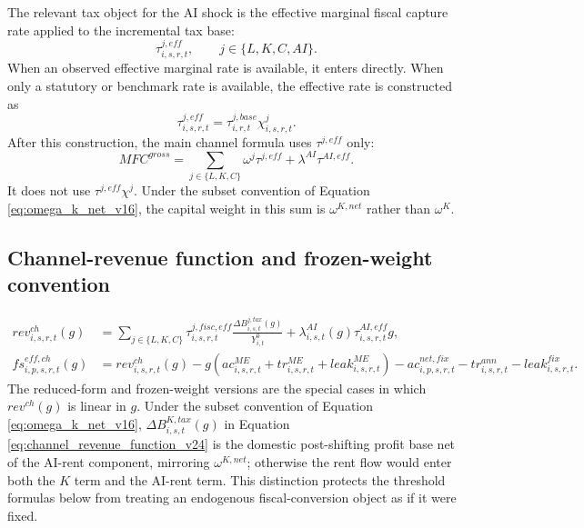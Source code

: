 \documentclass[11pt,a4paper]{article}
\begin{document}
The relevant tax object for the AI shock is the effective marginal fiscal capture rate applied to the incremental tax base:
\begin{equation}
    \tau^{j,eff}_{i,s,r,t},\qquad j\in\{L,K,C,AI\}.
\end{equation}
When an observed effective marginal rate is available, it enters directly. When only a statutory or benchmark rate is available, the effective rate is constructed as
\begin{equation}\label{eq:tau_eff_decomposition_v10}
    \tau^{j,eff}_{i,s,r,t}=\tau^{j,base}_{i,r,t}\chi^j_{i,s,r,t}.
\end{equation}
After this construction, the main channel formula uses $\tau^{j,eff}$ only:
\begin{equation}
    MFC^{gross}=\sum_{j\in\{L,K,C\}}\omega^j\tau^{j,eff}+\lambda^{AI}\tau^{AI,eff}.
\end{equation}
It does not use $\tau^{j,eff}\chi^j$. Under the subset convention of Equation \eqref{eq:omega_k_net_v16}, the capital weight in this sum is $\omega^{K,net}$ rather than $\omega^K$.

\subsection{Channel-revenue function and frozen-weight convention}

\begin{equation}\label{eq:channel_revenue_function_v24}
\begin{split}
    rev^{ch}_{i,s,r,t}(g)
    &=\sum_{j\in\{L,K,C\}}\tau^{j,fisc,eff}_{i,s,r,t}\frac{\Delta B^{j,tax}_{i,s,t}(g)}{Y^0_{i,t}}
      +\lambda^{AI}_{i,s,t}(g)\tau^{AI,eff}_{i,s,r,t}g,\\
    fs^{eff,ch}_{i,p,s,r,t}(g)
    &=rev^{ch}_{i,s,r,t}(g)
      -g\left(ac^{ME}_{i,s,r,t}+tr^{ME}_{i,s,r,t}+leak^{ME}_{i,s,r,t}\right)
      -ac^{net,fix}_{i,p,s,r,t}-tr^{ann}_{i,s,r,t}-leak^{fix}_{i,s,r,t}.
\end{split}
\end{equation}
The reduced-form and frozen-weight versions are the special cases in which $rev^{ch}(g)$ is linear in $g$. Under the subset convention of Equation \eqref{eq:omega_k_net_v16}, $\Delta B^{K,tax}_{i,s,t}(g)$ in Equation \eqref{eq:channel_revenue_function_v24} is the domestic post-shifting profit base net of the AI-rent component, mirroring $\omega^{K,net}$; otherwise the rent flow would enter both the $K$ term and the AI-rent term. This distinction protects the threshold formulas below from treating an endogenous fiscal-conversion object as if it were fixed.
\end{document}
